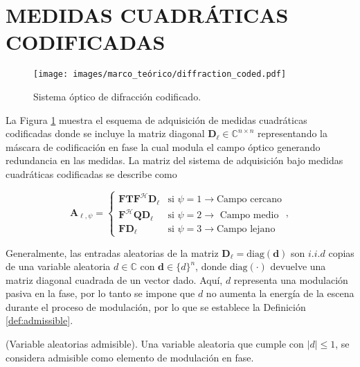 \pagebreak
\section{MEDIDAS CUADRÁTICAS CODIFICADAS}

\begin{figure}[!h]
    \centering
    \texttt{[image: images/marco\_teórico/diffraction\_coded.pdf]}
    \caption{\hspace{2mm}Sistema óptico de difracción codificado.}
    \label{fig:coded_difraction_systems}
\end{figure}


La Figura \ref{fig:coded_difraction_systems} muestra el esquema de adquisición de medidas cuadráticas codificadas donde se incluye la matriz diagonal $\mathbf{D}_\ell \in \mathbb{C}^{n\times n}$ representando la máscara de codificación en fase la cual modula el campo óptico generando redundancia en las medidas. La matriz del sistema de adquisición bajo medidas cuadráticas codificadas se describe como

\begin{equation}
    \mathbf{A}_{\ell,\psi}= \left\{\begin{matrix}
\mathbf{F}\mathbf{T}\mathbf{F}^\mathcal{H} \mathbf{D}_\ell  & \text{si } \psi=1\rightarrow \text{Campo cercano}\\ 
\mathbf{F}^\mathcal{H}\mathbf{Q}\mathbf{D}_\ell &\text{si } \psi=2\rightarrow\text{ Campo medio} \\ 
\mathbf{F}\mathbf{D}_\ell  &\text{si } \psi=3\rightarrow\text{Campo lejano}
\end{matrix}\right., \label{eq:matrix_a}
\end{equation}

Generalmente, las entradas aleatorias de la matriz  $\mathbf{D}_{\ell} = \mathrm{diag}(\mathbf{d})$ son $i.i.d$ copias de una variable aleatoria $d \in \mathbb{C}$ con $\mathbf{d} \in \{d\}^{n}$, donde $\mathrm{diag}(\cdot)$ devuelve una matriz diagonal cuadrada de un vector dado. Aquí, $d$ representa una modulación pasiva en la fase, por lo tanto se impone que $d$ no aumenta la energía de la escena durante el proceso de modulación, por lo que se establece la Definición \ref{def:admissible}.

\begin{definition}{(Variable aleatorias admisible). } 
    Una variable aleatoria que cumple con $|d|\leq 1$, se considera admisible como elemento de modulación en fase.\label{def:admissible}
\end{definition}



